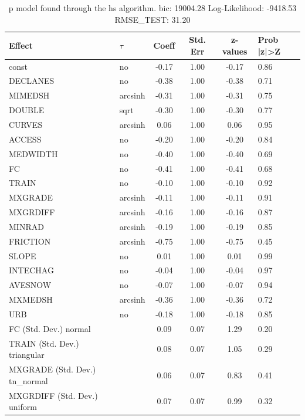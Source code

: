 \begin{table}
	\caption{p model found through the hs algorithm. bic: 19004.28 Log-Likelihood: -9418.53 RMSE_TEST: 31.20}
	\begin{center}
		\begin{tabular}{|l|l|c|c|c|l|}
			\hline
			Effect & $\tau$ & Coeff & Std. Err & z-values & Prob |z|>Z \\
			\hline
			const & no & -0.17 & 1.00 & -0.17 & 0.86 \\
			\hline
			DECLANES & no & -0.38 & 1.00 & -0.38 & 0.71 \\
			\hline
			MIMEDSH & arcsinh & -0.31 & 1.00 & -0.31 & 0.75 \\
			\hline
			DOUBLE & sqrt & -0.30 & 1.00 & -0.30 & 0.77 \\
			\hline
			CURVES & arcsinh & 0.06 & 1.00 & 0.06 & 0.95 \\
			\hline
			ACCESS & no & -0.20 & 1.00 & -0.20 & 0.84 \\
			\hline
			MEDWIDTH & no & -0.40 & 1.00 & -0.40 & 0.69 \\
			\hline
			FC & no & -0.41 & 1.00 & -0.41 & 0.68 \\
			\hline
			TRAIN & no & -0.10 & 1.00 & -0.10 & 0.92 \\
			\hline
			MXGRADE & arcsinh & -0.11 & 1.00 & -0.11 & 0.91 \\
			\hline
			MXGRDIFF & arcsinh & -0.16 & 1.00 & -0.16 & 0.87 \\
			\hline
			MINRAD & arcsinh & -0.19 & 1.00 & -0.19 & 0.85 \\
			\hline
			FRICTION & arcsinh & -0.75 & 1.00 & -0.75 & 0.45 \\
			\hline
			SLOPE & no & 0.01 & 1.00 & 0.01 & 0.99 \\
			\hline
			INTECHAG & no & -0.04 & 1.00 & -0.04 & 0.97 \\
			\hline
			AVESNOW & no & -0.07 & 1.00 & -0.07 & 0.94 \\
			\hline
			MXMEDSH & arcsinh & -0.36 & 1.00 & -0.36 & 0.72 \\
			\hline
			URB & no & -0.18 & 1.00 & -0.18 & 0.85 \\
			\hline
			FC (Std. Dev.) normal &  & 0.09 & 0.07 & 1.29 & 0.20 \\
			\hline
			TRAIN (Std. Dev.) triangular &  & 0.08 & 0.07 & 1.05 & 0.29 \\
			\hline
			MXGRADE (Std. Dev.) tn_normal &  & 0.06 & 0.07 & 0.83 & 0.41 \\
			\hline
			MXGRDIFF (Std. Dev.) uniform &  & 0.07 & 0.07 & 0.99 & 0.32 \\

\end{tabular}
\end{center}
\end{table}

